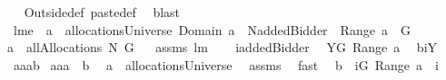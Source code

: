 \begin{isabellebody}
\isadelimproof
\ %
\endisadelimproof
%
\isatagproof
{}\isamarkupfalse%
\ Outside{\isacharunderscore}def\ paste{\isacharunderscore}def\ \isamarkupfalse%
\ blast%
\endisatagproof
{\isafoldproof}%
%
\isadelimproof
%
\endisadelimproof
\isanewline
\isanewline
{}\isamarkupfalse%
\ lm{}{}e{\isacharcolon}\ \ {\isachardoublequoteopen}a\ {\isasymin}\ allocationsUniverse{\isachardoublequoteclose}\ {\isachardoublequoteopen}Domain\ a\ {\isasymsubseteq}\ N{\isacharminus}{\isacharbraceleft}addedBidder{\isacharprime}{\isacharbraceright}{\isachardoublequoteclose}\ {\isachardoublequoteopen}{\isasymUnion}\ Range\ a\ {\isasymsubseteq}\ G{\isachardoublequoteclose}\ \isanewline
{\isachardoublequoteopen}a\ {\isasymin}\ allAllocations{\isacharprime}{\isacharprime}{\isacharprime}\ N\ G{\isachardoublequoteclose}%
\isadelimproof
\ %
\endisadelimproof
%
\isatagproof
{}\isamarkupfalse%
\ assms\ lm{}{}\ \isanewline
{}\isamarkupfalse%
\ {\isacharminus}\isanewline
{}\isamarkupfalse%
\ {\isacharquery}i{\isacharequal}{\isachardoublequoteopen}addedBidder{\isacharprime}{\isachardoublequoteclose}\ \isamarkupfalse%
\ {\isacharquery}Y{\isacharequal}{\isachardoublequoteopen}{\isacharbraceleft}G{\isacharminus}{\isasymUnion}\ Range\ a{\isacharbraceright}{\isacharminus}{\isacharbraceleft}{\isacharbraceleft}{\isacharbraceright}{\isacharbraceright}{\isachardoublequoteclose}\ \isamarkupfalse%
\ {\isacharquery}b{\isacharequal}{\isachardoublequoteopen}{\isacharbraceleft}{\isacharquery}i{\isacharbraceright}{\isasymtimes}{\isacharquery}Y{\isachardoublequoteclose}\ \isamarkupfalse%
\ {\isacharquery}aa{\isacharequal}{\isachardoublequoteopen}a{\isasymunion}{\isacharquery}b{\isachardoublequoteclose}\isanewline
{}\isamarkupfalse%
\ {\isacharquery}aa{\isacharprime}{\isacharequal}{\isachardoublequoteopen}a\ {\isacharplus}{\isacharasterisk}\ {\isacharquery}b{\isachardoublequoteclose}\ \isanewline
{}\isamarkupfalse%
\isanewline
{}{\isacharcolon}\ {\isachardoublequoteopen}a\ {\isasymin}\ allocationsUniverse{\isachardoublequoteclose}\ \isamarkupfalse%
\ assms{\isacharparenleft}{}{\isacharparenright}\ \isamarkupfalse%
\ fast\ \isanewline
{}\isamarkupfalse%
\ {\isachardoublequoteopen}{\isacharquery}b\ {\isasymsubseteq}\ {\isacharbraceleft}{\isacharparenleft}{\isacharquery}i{\isacharcomma}G{\isacharminus}{\isasymUnion}\ Range\ a{\isacharparenright}{\isacharbraceright}\ {\isacharminus}\ {\isacharbraceleft}{\isacharparenleft}{\isacharquery}i{\isacharcomma}\ {\isacharbraceleft}{\isacharbraceright}{\isacharparenright}{\isacharbraceright}{\isachardoublequoteclose}\ \isamarkupfalse%

\end{isabellebody}
